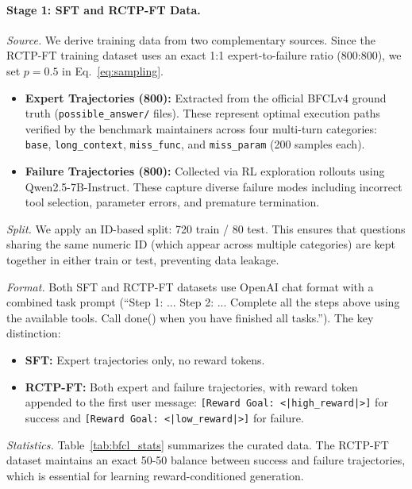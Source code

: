 \documentclass{article}
\theoremstyle{plain}
\theoremstyle{definition}
\theoremstyle{remark}
\begin{document}
\paragraph{Stage 1: SFT and RCTP-FT Data.}

\textit{Source.} We derive training data from two complementary sources. Since the RCTP-FT training dataset uses an exact 1:1 expert-to-failure ratio (800:800), we set $p=0.5$ in Eq.~\ref{eq:sampling}.
\begin{itemize}
    \item \textbf{Expert Trajectories (800):} Extracted from the official BFCLv4 ground truth (\texttt{possible\_answer/} files). These represent optimal execution paths verified by the benchmark maintainers across four multi-turn categories: \texttt{base}, \texttt{long\_context}, \texttt{miss\_func}, and \texttt{miss\_param} (200 samples each).
    \item \textbf{Failure Trajectories (800):} Collected via RL exploration rollouts using Qwen2.5-7B-Instruct. These capture diverse failure modes including incorrect tool selection, parameter errors, and premature termination.
\end{itemize}

\textit{Split.} We apply an ID-based split: 720 train / 80 test. This ensures that questions sharing the same numeric ID (which appear across multiple categories) are kept together in either train or test, preventing data leakage.

\textit{Format.} Both SFT and RCTP-FT datasets use OpenAI chat format with a combined task prompt (``Step 1: ... Step 2: ... Complete all the steps above using the available tools. Call done() when you have finished all tasks.''). The key distinction:
\begin{itemize}
    \item \textbf{SFT:} Expert trajectories only, no reward tokens.
    \item \textbf{RCTP-FT:} Both expert and failure trajectories, with reward token appended to the first user message: \texttt{[Reward Goal: <|high\_reward|>]} for success and \texttt{[Reward Goal: <|low\_reward|>]} for failure.
\end{itemize}

\textit{Statistics.} Table~\ref{tab:bfcl_stats} summarizes the curated data. The RCTP-FT dataset maintains an exact 50-50 balance between success and failure trajectories, which is essential for learning reward-conditioned generation.
\end{document}

